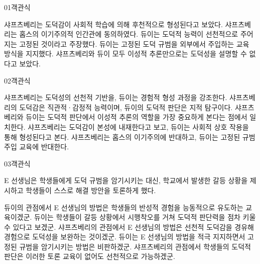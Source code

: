 \documentclass[fs85,seriesWit]{korfarm-base}
\begin{document}
\kfBeginMC
\begin{kfQBlock}{01}{객관식}
\begin{kfChoices}
\kfChoice 샤프츠베리는 도덕감이 사회적 학습에 의해 후천적으로 형성된다고 보았다.
\kfChoice 샤프츠베리는 홉스의 이기주의적 인간관에 동의하였다.
\kfChoice 듀이는 도덕적 능력이 선천적으로 주어지는 고정된 것이라고 주장했다.
\kfChoice 듀이는 고정된 도덕 규범을 외부에서 주입하는 교육 방식을 지지했다.
\kfChoice 샤프츠베리와 듀이 모두 이성적 추론만으로는 도덕성을 설명할 수 없다고 보았다.
\end{kfChoices}
\end{kfQBlock}

\begin{kfQBlock}{02}{객관식}
\begin{kfChoices}
\kfChoice 샤프츠베리는 도덕성의 선천적 기반을, 듀이는 경험적 형성 과정을 강조한다.
\kfChoice 샤프츠베리의 도덕감은 직관적·감정적 능력이며, 듀이의 도덕적 판단은 지적 탐구이다.
\kfChoice 샤프츠베리와 듀이는 도덕적 판단에서 이성적 추론의 역할을 가장 중요하게 본다는 점에서 일치한다.
\kfChoice 샤프츠베리는 도덕감이 본성에 내재한다고 보고, 듀이는 사회적 상호 작용을 통해 형성된다고 본다.
\kfChoice 샤프츠베리는 홉스의 이기주의에 반대하고, 듀이는 고정된 규범 주입 교육에 반대한다.
\end{kfChoices}
\end{kfQBlock}

\begin{kfQBlock}{03}{객관식}
\begin{kfEvidence}E 선생님은 학생들에게 도덕 규범을 암기시키는 대신, 학교에서 발생한 갈등 상황을 제시하고 학생들이 스스로 해결 방안을 토론하게 했다.\end{kfEvidence}
\begin{kfChoices}
\kfChoice 듀이의 관점에서 E 선생님의 방법은 학생들의 반성적 경험을 능동적으로 유도하는 교육이겠군.
\kfChoice 듀이는 학생들이 갈등 상황에서 시행착오를 거쳐 도덕적 판단력을 점차 키울 수 있다고 보겠군.
\kfChoice 샤프츠베리의 관점에서 E 선생님의 방법은 선천적 도덕감을 경유해 경험으로 도덕성을 보완하는 것이겠군.
\kfChoice 듀이는 E 선생님의 방법을 적극 지지하면서 고정된 규범을 암기시키는 방법은 비판하겠군.
\kfChoice 샤프츠베리의 관점에서 학생들의 도덕적 판단은 이러한 토론 교육이 없어도 선천적으로 가능하겠군.
\end{kfChoices}
\end{kfQBlock}
\end{document}
